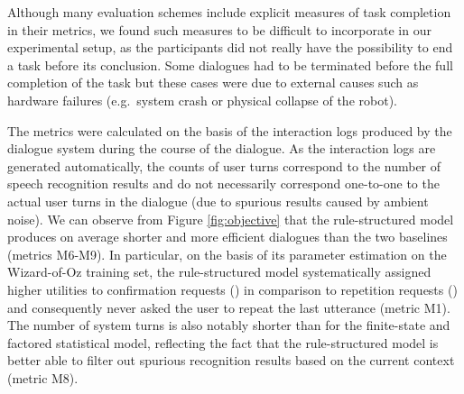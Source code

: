 Although many evaluation schemes include explicit measures of task completion in their metrics, we found such measures to be difficult to incorporate in our experimental setup, as the participants did not really have the possibility to end a task before its conclusion. Some dialogues had to be terminated before the full completion of the task but these cases were due to external causes such as hardware failures (e.g.\ system crash or physical collapse of the robot).
 
The metrics were calculated on the basis of the interaction logs produced by the dialogue system during the course of the dialogue. As the interaction logs are generated automatically, the counts of user turns correspond to the number of speech recognition results and do not necessarily correspond one-to-one to the actual user turns in the dialogue (due to spurious results caused by ambient noise). We can observe from Figure \ref{fig:objective} that the rule-structured model produces on average shorter and more efficient dialogues than the two baselines (metrics M6-M9).  In particular, on the basis of its parameter estimation on the Wizard-of-Oz training set, the rule-structured model systematically assigned higher utilities to confirmation requests () in comparison to repetition requests () and 
consequently never asked the user to repeat the last utterance (metric M1). The number of system turns is also notably shorter than for the finite-state and factored statistical model, reflecting the fact that the rule-structured model is better able to filter out spurious recognition results based on the current context (metric M8). 

